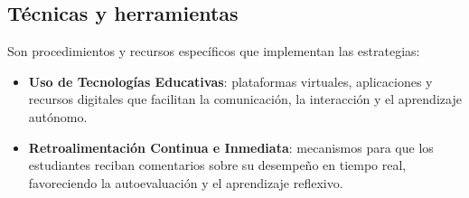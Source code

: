 \subsection*{Técnicas y herramientas}
Son procedimientos y recursos específicos que implementan las estrategias:
\begin{itemize}[leftmargin=*, itemsep=0.6em]
    \item \textbf{Uso de Tecnologías Educativas}: plataformas virtuales, aplicaciones y recursos digitales que facilitan la comunicación, la interacción y el aprendizaje autónomo.
    \item \textbf{Retroalimentación Continua e Inmediata}: mecanismos para que los estudiantes reciban comentarios sobre su desempeño en tiempo real, favoreciendo la autoevaluación y el aprendizaje reflexivo.
\end{itemize}
\pagebreak